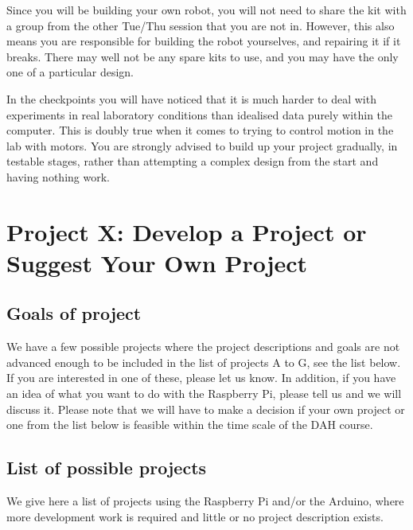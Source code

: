 Since you will be building your own robot, you will not need to share the kit with a group from the other Tue/Thu session that you are not in.
However, this also means you are responsible for building the robot yourselves, and repairing it if it breaks.
There may well not be any spare kits to use, and you may have the only one of a particular design.

In the checkpoints you will have noticed that it is much harder to deal with experiments in real laboratory conditions than idealised data purely within the computer.
This is doubly true when it comes to trying to control motion in the lab with motors.
You are strongly advised to build up your project gradually, in testable stages, rather than attempting a complex design from the start and having nothing work.



\section{Project X: Develop a Project or Suggest Your Own Project}

\subsection{Goals of project}

We have a few possible projects where the project descriptions and goals are not advanced enough to be included in the list of projects A to G, see the list below.
If you are interested in one of these, please let us know.
In addition, if you have an idea of what you want to do with the Raspberry Pi, please tell us and we will discuss it.
Please note that we will have to make a decision if your own project or one from the list below is feasible within the time scale of the DAH course.


\subsection{List of possible projects}

We give here a list of projects using the Raspberry Pi and/or the Arduino, where more development work is required and little or no project description exists. 

